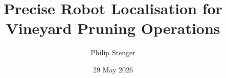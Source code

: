 \documentclass[oneside,openany]{electhesis}
\begin{document}


\title{Precise Robot Localisation for Vineyard Pruning Operations}
\author{Philip Stenger}
\date{29 May 2026}

\frontmatter

\maketitle







\tableofcontents



\mainmatter












\appendix

\end{document}
